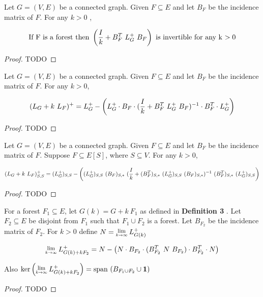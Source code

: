 \begin{HXl}
 Let $G = (V, E)$ be a connected graph. Given $F \subseteq E$ and let $B_F$ be the incidence matrix of $F$. For any $k > 0$ , 
 
 $$\text{If F is a forest then } \left( \frac{I}{k} +  B_F^T \ L_{G}^{+} \ B_F \right) \ \text{is invertible for any k $> 0$}$$
\end{HXl}

\begin{proof}
 TODO
\end{proof}

\begin{HXt}
 Let $G = (V, E)$ be a connected graph. Given $F \subseteq E$ and let $B_F$ be the incidence matrix of $F$. For any $k > 0$,
 
 $$ (L_G + k \ L_F)^+ = \laplacian - \left(\laplacian \cdot B_F \cdot (\frac{I}{k} + B_F^T \ \laplacian \ B_F)^{-1} \cdot B_F^T \cdot \laplacian \right)$$
 
\end{HXt}

\begin{proof}
 TODO
\end{proof}

\begin{HXc}
 Let $G = (V, E)$ be a connected graph. Given $F \subseteq E$ and let $B_F$ be the incidence matrix of $F$. Suppose $F \subseteq E[S]$, where $S \subseteq V$. For any $k > 0$,
 
  $$ (L_G + k \ L_F)^+_{S,S} = (L_{G}^{+})_{S,S} - \left((L_{G}^{+})_{S,S} \  (B_F)_{S,*} \  (\frac{I}{k} + (B_F^T)_{S,*} \ (L_{G}^{+})_{S,S} \ (B_F)_{S,*})^{-1} \   (B_F^T)_{S,*} \  (L_{G}^{+} )_{S,S} \right)$$
 
\end{HXc}
\begin{proof}
 TODO
\end{proof}

\begin{HXt}
 For a forest $F_1 \subseteq E$, let $G(k) = G + k \ F_1$ as defined in \textbf{Definition 3} . Let $F_2 \subseteq E$ be disjoint from $F_1$ such that $F_1 \cup F_2$ is a forest. Let $B_{F_2}$ be the incidence matrix of $F_2$. For $k > 0$ define $N = \Lim{k \to \infty} \laplacian[G(k)]$

 $$ \Lim{k \to \infty} \laplacian[G(k) + kF_2] = N - \left( N \cdot B_{F_2} \cdot (B_{F_2}^T \ N \ B_{F_2}) \cdot B_{F_2}^T \cdot N \right)$$ 

 Also $\text{ker} \left( \Lim{k \to \infty} \laplacian[G(k) + kF_2] \right) = \text{span }(B_{F_1 \cup F_2} \cup \textbf{1})$
 \end{HXt}



\begin{proof}
 TODO
\end{proof}







